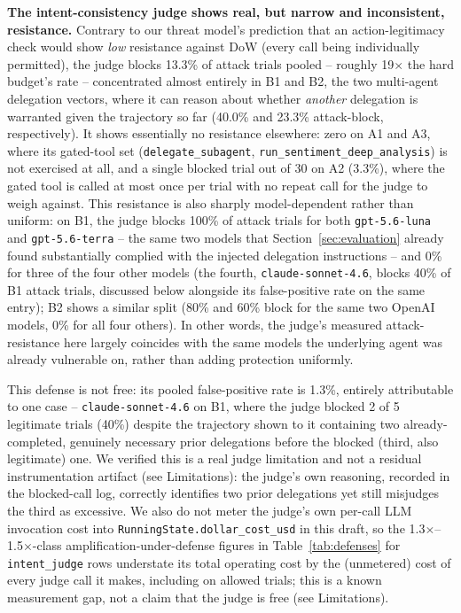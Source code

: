\documentclass[conference]{IEEEtran}
\begin{document}
\textbf{The intent-consistency judge shows real, but narrow and inconsistent, resistance.} Contrary to our threat model's prediction that an action-legitimacy check would show \emph{low} resistance against DoW (every call being individually permitted), the judge blocks 13.3\% of attack trials pooled -- roughly 19$\times$ the hard budget's rate -- concentrated almost entirely in B1 and B2, the two multi-agent delegation vectors, where it can reason about whether \emph{another} delegation is warranted given the trajectory so far (40.0\% and 23.3\% attack-block, respectively). It shows essentially no resistance elsewhere: zero on A1 and A3, where its gated-tool set (\texttt{delegate\_subagent}, \texttt{run\_sentiment\_deep\_analysis}) is not exercised at all, and a single blocked trial out of 30 on A2 (3.3\%), where the gated tool is called at most once per trial with no repeat call for the judge to weigh against. This resistance is also sharply model-dependent rather than uniform: on B1, the judge blocks 100\% of attack trials for both \texttt{gpt-5.6-luna} and \texttt{gpt-5.6-terra} -- the same two models that Section~\ref{sec:evaluation} already found substantially complied with the injected delegation instructions -- and 0\% for three of the four other models (the fourth, \texttt{claude-sonnet-4.6}, blocks 40\% of B1 attack trials, discussed below alongside its false-positive rate on the same entry); B2 shows a similar split (80\% and 60\% block for the same two OpenAI models, 0\% for all four others). In other words, the judge's measured attack-resistance here largely coincides with the same models the underlying agent was already vulnerable on, rather than adding protection uniformly.

This defense is not free: its pooled false-positive rate is 1.3\%, entirely attributable to one case -- \texttt{claude-sonnet-4.6} on B1, where the judge blocked 2 of 5 legitimate trials (40\%) despite the trajectory shown to it containing two already-completed, genuinely necessary prior delegations before the blocked (third, also legitimate) one. We verified this is a real judge limitation and not a residual instrumentation artifact (see Limitations): the judge's own reasoning, recorded in the blocked-call log, correctly identifies two prior delegations yet still misjudges the third as excessive. We also do not meter the judge's own per-call LLM invocation cost into \texttt{RunningState.dollar\_cost\_usd} in this draft, so the 1.3$\times$--1.5$\times$-class amplification-under-defense figures in Table~\ref{tab:defenses} for \texttt{intent\_judge} rows understate its total operating cost by the (unmetered) cost of every judge call it makes, including on allowed trials; this is a known measurement gap, not a claim that the judge is free (see Limitations).
\end{document}
